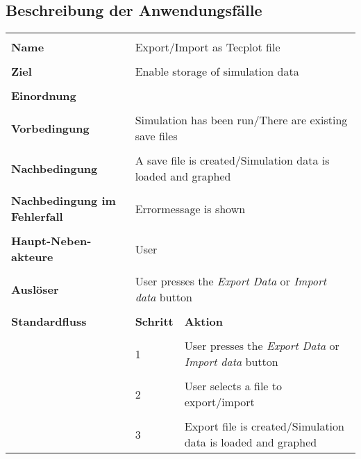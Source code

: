 {\subsection*{Beschreibung der Anwendungsf\"alle}
\begin{tabular}{|p{5cm}|p{2cm}|p{3cm}|}
\hline \\
\textbf{Name} & \multicolumn{2}{p{5cm}|}{Export/Import as Tecplot file} \\
\hline \\
\textbf{Ziel} & \multicolumn{2}{p{5cm}|}{Enable storage of simulation data} \\
\hline \\
\textbf{Einordnung} & \multicolumn{2}{p{5cm}|}{} \\
\hline \\
\textbf{Vorbedingung} & \multicolumn{2}{p{5cm}|}{Simulation has been run/There are existing save files} \\
\hline \\
\textbf{Nachbedingung} & \multicolumn{2}{p{5cm}|}{A save file is created/Simulation data is loaded and graphed} \\
\hline \\
\textbf{Nachbedingung im Fehlerfall} & \multicolumn{2}{p{5cm}|}{Errormessage is shown}\\
\hline \\
\textbf{Haupt-Neben-akteure} & \multicolumn{2}{p{5cm}|}{User} \\
\hline \\
\textbf{Ausl\"oser} & \multicolumn{2}{p{5cm}|}{User presses the \textit{Export Data} or \textit{Import data} button} \\
\hline \\
\textbf{Standardfluss} & \textbf{Schritt}& \textbf{Aktion} \\
\hline \\
& 1 & User presses the \textit{Export Data} or \textit{Import data} button \\
\hline \\
& 2 & User selects a file to export/import \\
\hline \\
& 3 & Export file is created/Simulation data is loaded and graphed \\
\hline
\end{tabular}

}
